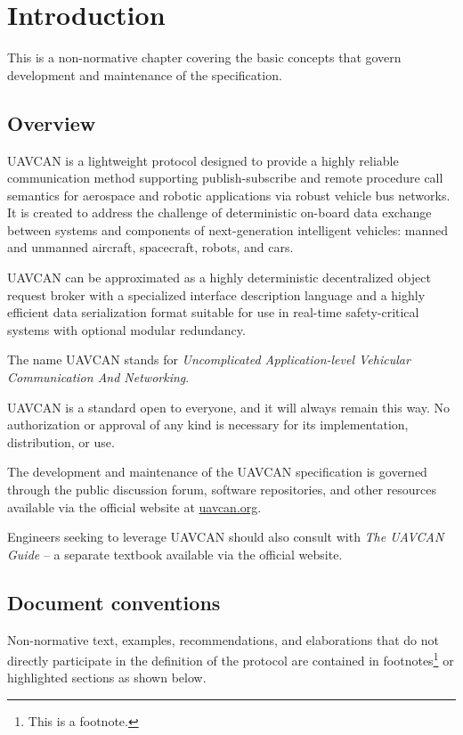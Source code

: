\chapter{Introduction}\label{sec:introduction}

This is a non-normative chapter covering the basic concepts that govern development and maintenance of
the specification.

\section{Overview}

UAVCAN is a lightweight protocol designed to provide a highly reliable communication method
supporting publish-subscribe and remote procedure call semantics
for aerospace and robotic applications via robust vehicle bus networks.
It is created to address the challenge of deterministic on-board data exchange between systems and components
of next-generation intelligent vehicles: manned and unmanned aircraft, spacecraft, robots, and cars.

UAVCAN can be approximated as a highly deterministic decentralized object request broker
with a specialized interface description language and a highly efficient data serialization format
suitable for use in real-time safety-critical systems with optional modular redundancy.

The name UAVCAN stands for \emph{Uncomplicated Application-level Vehicular Communication And Networking}.

UAVCAN is a standard open to everyone, and it will always remain this way.
No authorization or approval of any kind is necessary for its implementation, distribution, or use.

The development and maintenance of the UAVCAN specification is governed through the public discussion forum,
software repositories, and other resources available via the official website at \href{http://uavcan.org}{uavcan.org}.

Engineers seeking to leverage UAVCAN should also consult with \emph{The UAVCAN Guide} --
a separate textbook available via the official website.

\section{Document conventions}

Non-normative text, examples, recommendations, and elaborations that do not directly participate
in the definition of the protocol are contained in footnotes\footnote{This is a footnote.}
or highlighted sections as shown below.

